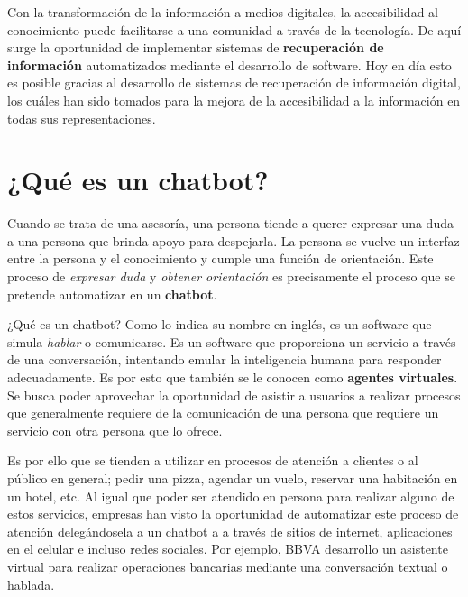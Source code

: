 Con la transformación de la información a medios digitales, la accesibilidad al conocimiento puede facilitarse a una comunidad a través de la tecnología. De aquí surge la oportunidad de implementar sistemas de \textbf{recuperación de información} automatizados mediante el desarrollo de software. Hoy en día esto es posible gracias al desarrollo de sistemas de recuperación de información digital, los cuáles han sido tomados para la mejora de la accesibilidad a la información en todas sus representaciones.

\section{¿Qué es un chatbot?}


Cuando se trata de una asesoría, una persona tiende a querer expresar una duda a una persona que brinda apoyo para despejarla. La persona se vuelve un interfaz entre la persona y el conocimiento y cumple una función de orientación. Este proceso de \textit{expresar duda} y \textit{obtener orientación} es precisamente el proceso que se pretende automatizar en un \textbf{chatbot}.

¿Qué es un chatbot? Como lo indica su nombre en inglés, es un software que simula \textit{hablar} o comunicarse. Es un software que proporciona un servicio a través de una conversación, intentando emular la inteligencia humana para responder adecuadamente. Es por esto que también se le conocen como \textbf{agentes virtuales}. Se busca poder aprovechar la oportunidad de asistir a usuarios a realizar procesos que generalmente requiere de la comunicación de una persona que requiere un servicio con otra persona que lo ofrece.

Es por ello que se tienden a utilizar en procesos de atención a clientes o al público en general; pedir una pizza, agendar un vuelo, reservar una habitación en un hotel, etc. Al igual que poder ser atendido en persona para realizar alguno de estos servicios, empresas han visto la oportunidad de automatizar este proceso de atención delegándosela a un chatbot a a través de sitios de internet, aplicaciones en el celular e incluso redes sociales. Por ejemplo, BBVA desarrollo un asistente virtual para realizar operaciones bancarias mediante una conversación textual o hablada.

